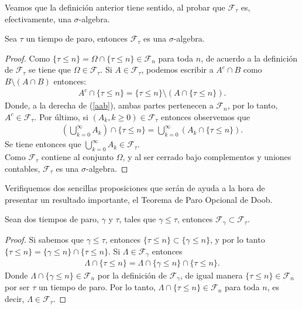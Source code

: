 Veamos que la definición anterior tiene sentido, al probar que $\mathcal{F}_{\tau}$ es, efectivamente, una $\sigma$-algebra.
\begin{proposition}
	Sea $\tau$ un tiempo de paro, entonces $\mathcal{F}_{\tau}$ es una $\sigma$-algebra.
\end{proposition}
\begin{proof}
	Como $\{ \tau \leq n \} = \Omega \cap \{ \tau \leq n \} \in \mathcal{F}_n$ para toda $n$, de acuerdo a la definición de $\mathcal{F}_{\tau}$ se tiene que $\Omega \in \mathcal{F}_{\tau}$. Si $A \in \mathcal{F}_{\tau}$, podemos escribir a $A^{c} \cap B$ como $B \setminus (A \cap B)$ entonces:
	\begin{align}
		A^{c} \cap \{ \tau \leq n \} = \{ \tau \leq n \} \setminus (A \cap \{ \tau \leq n \}). \label{aab}
	\end{align}
	Donde, a la derecha de (\ref{aab}), ambas partes pertenecen a $\mathcal{F}_{n}$, por lo tanto, $A^{c} \in \mathcal{F}_{\tau}$. Por último, si $(A_k, k \geq 0) \in \mathcal{F}_{\tau}$ entonces observemos que
	\begin{align*}
		\left(\bigcup_{k=0}^{\infty} A_k\right) \cap \{ \tau \leq n \} = \bigcup_{k=0}^{\infty} (A_k \cap \{ \tau \leq n \}).
	\end{align*}
	Se tiene entonces que $\bigcup_{k=0}^{\infty} A_k \in \mathcal{F}_{\tau}$. \\
	
	Como $\mathcal{F}_{\tau}$ contiene al conjunto $\Omega$, y al ser cerrado bajo complementos y uniones contables,  $\mathcal{F}_{\tau}$ es una $\sigma$-algebra.
\end{proof}

Verifiquemos dos sencillas proposiciones que serán de ayuda a la hora de presentar un resultado importante, el  Teorema de Paro Opcional de Doob.
\begin{proposition}
\label{inclu}
	Sean dos tiempos de paro, $\gamma$ y $\tau$, tales que $\gamma \leq \tau$, entonces $\mathcal{F}_{\gamma} \subset \mathcal{F}_{\tau}$.
\end{proposition}
\begin{proof}
	Si sabemos que $\gamma \leq \tau$, entonces $\{ \tau \leq n \} \subset \{ \gamma \leq n \}$, y por lo tanto $\{ \tau \leq n \} = \{ \gamma \leq n \} \cap \{ \tau \leq n \}$. Si $\Lambda \in \mathcal{F}_{\gamma}$ entonces
	\begin{align*}
		\Lambda \cap \{ \tau \leq n \} = \Lambda \cap \{ \gamma \leq n \} \cap \{ \tau \leq n \}.
	\end{align*}
	Donde $\Lambda \cap \{ \gamma \leq n \} \in \mathcal{F}_n$ por la definición de $\mathcal{F}_{\gamma}$, de igual manera $\{ \tau \leq n \} \in \mathcal{F}_n$ por ser $\tau$ un tiempo de paro. Por lo tanto, $\Lambda \cap \{ \tau \leq n \} \in \mathcal{F}_n$ para toda $n$, es decir, $\Lambda \in \mathcal{F}_{\tau}$.
\end{proof}

